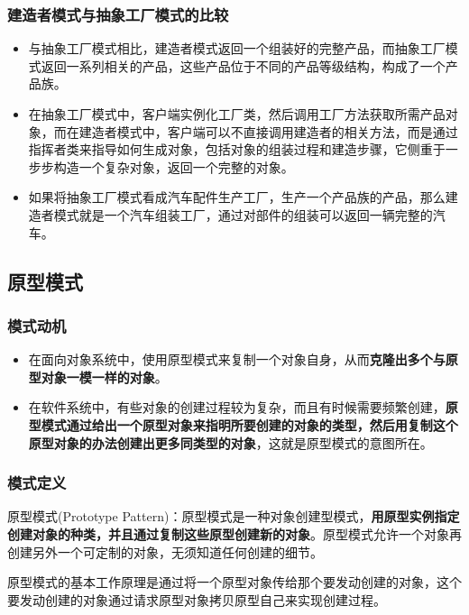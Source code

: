 \subsubsection{建造者模式与抽象工厂模式的比较}
\begin{itemize}
    \item 与抽象工厂模式相比，建造者模式返回一个组装好的完整产品，而抽象工厂模式返回一系列相关的产品，这些产品位于不同的产品等级结构，构成了一个产品族。
    \item 在抽象工厂模式中，客户端实例化工厂类，然后调用工厂方法获取所需产品对象，而在建造者模式中，客户端可以不直接调用建造者的相关方法，而是通过指挥者类来指导如何生成对象，包括对象的组装过程和建造步骤，它侧重于一步步构造一个复杂对象，返回一个完整的对象。
    \item 如果将抽象工厂模式看成汽车配件生产工厂，生产一个产品族的产品，那么建造者模式就是一个汽车组装工厂，通过对部件的组装可以返回一辆完整的汽车。
\end{itemize}


\subsection{原型模式}

\subsubsection{模式动机}
\begin{itemize}
    \item 在面向对象系统中，使用原型模式来复制一个对象自身，从而\textbf{克隆出多个与原型对象一模一样的对象}。
    \item 在软件系统中，有些对象的创建过程较为复杂，而且有时候需要频繁创建，\textbf{原型模式通过给出一个原型对象来指明所要创建的对象的类型，然后用复制这个原型对象的办法创建出更多同类型的对象}，这就是原型模式的意图所在。
\end{itemize}

\subsubsection{模式定义}
原型模式(Prototype Pattern)：原型模式是一种对象创建型模式，\textbf{用原型实例指定创建对象的种类，并且通过复制这些原型创建新的对象}。原型模式允许一个对象再创建另外一个可定制的对象，无须知道任何创建的细节。

原型模式的基本工作原理是通过将一个原型对象传给那个要发动创建的对象，这个要发动创建的对象通过请求原型对象拷贝原型自己来实现创建过程。

